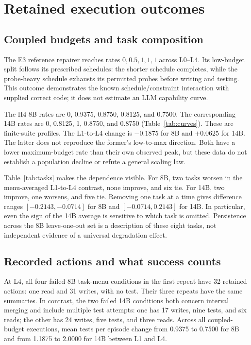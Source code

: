 \documentclass[11pt]{article}
\begin{document}
\section{Retained execution outcomes}
\subsection{Coupled budgets and task composition}
The E3 reference repairer reaches rates $0,0.5,1,1,1$ across L0--L4. Its low-budget split follows its prescribed schedules: the shorter schedule completes, while the probe-heavy schedule exhausts its permitted probes before writing and testing. This outcome demonstrates the known schedule/constraint interaction with supplied correct code; it does not estimate an LLM capability curve.

The H4 8B rates are 0, 0.9375, 0.8750, 0.8125, and 0.7500. The corresponding 14B rates are 0, 0.8125, 1, 0.8750, and 0.8750 (Table~\ref{tab:curves}). These are finite-suite profiles. The L1-to-L4 change is $-0.1875$ for 8B and $+0.0625$ for 14B. The latter does not reproduce the former's low-to-max direction. Both have a lower maximum-budget rate than their own observed peak, but these data do not establish a population decline or refute a general scaling law.


Table~\ref{tab:tasks} makes the dependence visible. For 8B, two tasks worsen in the menu-averaged L1-to-L4 contrast, none improve, and six tie. For 14B, two improve, one worsens, and five tie. Removing one task at a time gives difference ranges $[-0.2143,-0.0714]$ for 8B and $[-0.0714,0.2143]$ for 14B. In particular, even the sign of the 14B average is sensitive to which task is omitted. Persistence across the 8B leave-one-out set is a description of these eight tasks, not independent evidence of a universal degradation effect.

\subsection{Recorded actions and what success counts}
At L4, all four failed 8B task-menu conditions in the first repeat have 32 retained actions: one read and 31 writes, with no test. Their three repeats have the same summaries. In contrast, the two failed 14B conditions both concern interval merging and include multiple test attempts: one has 17 writes, nine tests, and six reads; the other has 24 writes, five tests, and three reads. Across all coupled-budget executions, mean tests per episode change from 0.9375 to 0.7500 for 8B and from 1.1875 to 2.0000 for 14B between L1 and L4.
\end{document}
